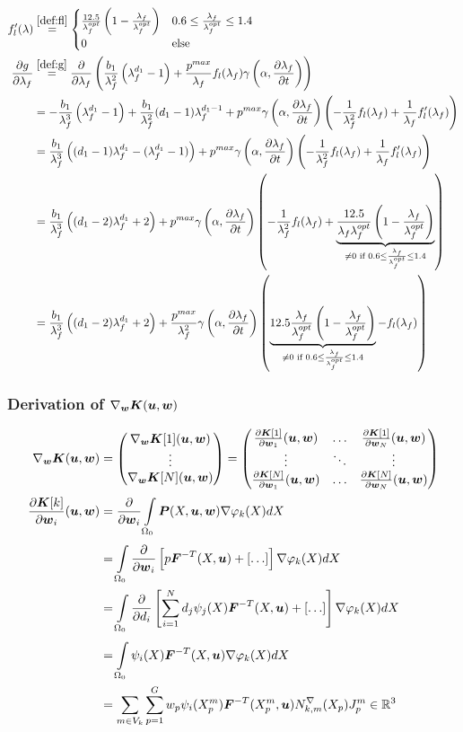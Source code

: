 \begin{align*}
	  f_l'(\lambda) &\re{def:fl} \begin{cases}
		\frac{12.5}{\lfo}\left(1-\frac{\lambda_f}{\lfo}\right) & 0.6 \leq \frac{\lambda_f}{\lfo} \leq 1.4\\ 
		0 & \text{else}
	\end{cases}\\	
	   \d{g}{\lambda_f} &\re{def:g} \d{}{\lambda_f}\left(\frac{b_1}{\lambda_f^2}\left(\lambda_f^{d_1} - 1\right)
		+\frac{p^{max}}{\lambda_f}f_l(\lambda_f)\gamma\left(\alpha,\d{\lambda_f}{t}\right)\right)\\
		&= -\frac{b_1}{\lambda_f^3}\left(\lambda_f^{d_1} - 1\right) + \frac{b_1}{\lambda_f^2}(d_1-1)\lambda_f^{d_1-1}
		+p^{max}\gamma\left(\alpha,\d{\lambda_f}{t}\right) \left(-\frac{1}{\lambda_f^2}f_l(\lambda_f) + \frac{1}{\lambda_f}f_l'(\lambda_f)\right)\\
		&= \frac{b_1}{\lambda_f^3}\left((d_1-1)\lambda_f^{d_1} - (\lambda_f^{d_1} - 1)\right)
		+p^{max}\gamma\left(\alpha,\d{\lambda_f}{t}\right) \left(-\frac{1}{\lambda_f^2}f_l(\lambda_f) + \frac{1}{\lambda_f}f_l'(\lambda_f)\right)\\
		&= \frac{b_1}{\lambda_f^3}\left((d_1-2)\lambda_f^{d_1} + 2\right)
		+p^{max}\gamma\left(\alpha,\d{\lambda_f}{t}\right) \left(-\frac{1}{\lambda_f^2}f_l(\lambda_f) 
		+ \underbrace{\frac{12.5}{\lambda_f\lfo}\left(1-\frac{\lambda_f}{\lfo}\right)}_{\neq 0\text{ if }0.6 \leq \frac{\lambda_f}{\lfo} \leq 1.4}\right)\\
		&= \frac{b_1}{\lambda_f^3}\left((d_1-2)\lambda_f^{d_1} + 2\right)
		+ \frac{p^{max}}{\lambda_f^2}\gamma\left(\alpha,\d{\lambda_f}{t}\right) \left( 
		\underbrace{12.5\frac{\lambda_f}{\lfo}\left(1-\frac{\lambda_f}{\lfo}\right)}_{\neq 0\text{ if }0.6 \leq \frac{\lambda_f}{\lfo} \leq 1.4}-f_l(\lambda_f)\right)
\end{align*}

\subsubsection{Derivation of $\nabla_{\boldsymbol{w}}\boldsymbol{K}(\boldsymbol{u},\boldsymbol{w})$}
\begin{align*}
	\nabla_{\boldsymbol{w}}\boldsymbol{K}(\boldsymbol{u},\boldsymbol{w}) &= \left(\begin{matrix}\nabla_{\boldsymbol{w}}\boldsymbol{K}[1](\boldsymbol{u},\boldsymbol{w})\\ \vdots \\ \nabla_{\boldsymbol{w}}\boldsymbol{K}[N](\boldsymbol{u},\boldsymbol{w})\end{matrix}\right)
	 = \left(\begin{matrix}\frac{\partial \boldsymbol{K}[1]}{\partial \boldsymbol{w}_1}(\boldsymbol{u},\boldsymbol{w}) & \ldots & \frac{\partial \boldsymbol{K}[1]}{\partial \boldsymbol{w}_N}(\boldsymbol{u},\boldsymbol{w})\\
	 	\vdots & \ddots & \vdots\\
	   \frac{\partial \boldsymbol{K}[N]}{\partial \boldsymbol{w}_1}(\boldsymbol{u},\boldsymbol{w}) & \ldots & \frac{\partial \boldsymbol{K}[N]}{\partial \boldsymbol{w}_N}(\boldsymbol{u},\boldsymbol{w})\end{matrix}\right)\\
	\frac{\partial \boldsymbol{K}[k]}{\partial \boldsymbol{w}_i}(\boldsymbol{u},\boldsymbol{w}) &= \frac{\partial }{\partial \boldsymbol{w}_i} \int\limits_{\Omega_0}^{}\boldsymbol{P}(X,\boldsymbol{u},\boldsymbol{w})\nabla\varphi_{k}(X) dX\\
		&=  \int\limits_{\Omega_0}^{}\frac{\partial }{\partial \boldsymbol{w}_i} \left[p\boldsymbol{F}^{-T}(X,\boldsymbol{u}) +[\ldots] \right] \nabla\varphi_{k}(X) dX\\
		&=  \int\limits_{\Omega_0}^{}\frac{\partial }{\partial d_i} \left[\sum\limits_{i=1}^{N} d_j\psi_j(X)\boldsymbol{F}^{-T}(X,\boldsymbol{u}) +[\ldots] \right] \nabla\varphi_{k}(X) dX\\
		&=  \int\limits_{\Omega_0}^{} \psi_i(X)\boldsymbol{F}^{-T}(X,\boldsymbol{u})\nabla\varphi_{k}(X) dX\\
		&= \sum\limits_{m\in V_k}^{}\sum\limits_{p=1}^{G} w_p \psi_i(X^m_p)\boldsymbol{F}^{-T}(X^m_p,\boldsymbol{u}) N^\nabla_{k,m}(X_p)J^m_p\in\mathbb{R}^3
\end{align*}

